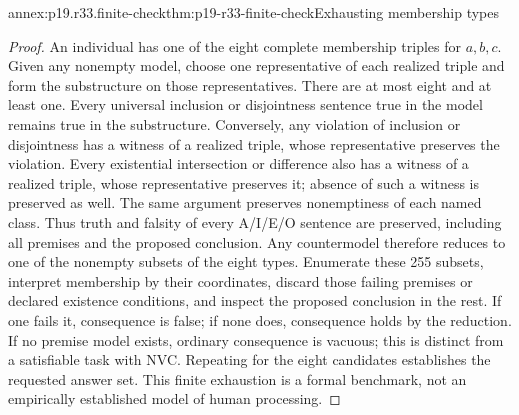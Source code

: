 \begin{annexitem}{annex:p19.r33.finite-check}{thm:p19-r33-finite-check}{Exhausting membership types}
\begin{proof}
An individual has one of the eight complete membership triples for
\(a,b,c\). Given any nonempty model, choose one representative of
each realized triple and form the substructure on those representatives.
There are at most eight and at least one. Every universal inclusion or
disjointness sentence true in the model remains true in the substructure.
Conversely, any violation of inclusion or disjointness has a witness of
a realized triple, whose representative preserves the violation.
Every existential intersection or difference also has a witness of a
realized triple, whose representative preserves it; absence of such a
witness is preserved as well. The same argument preserves nonemptiness
of each named class. Thus truth and falsity of every A/I/E/O sentence
are preserved, including all premises and the proposed conclusion.
Any countermodel therefore reduces to one of the nonempty subsets of
the eight types. Enumerate these 255 subsets, interpret membership by
their coordinates, discard those failing premises or declared existence
conditions, and inspect the proposed conclusion in the rest. If one
fails it, consequence is false; if none does, consequence holds by the
reduction. If no premise model exists, ordinary consequence is vacuous;
this is distinct from a satisfiable task with NVC. Repeating for the
eight candidates establishes the requested answer set. This finite
exhaustion is a formal benchmark, not an empirically established model
of human processing.
\end{proof}
\end{annexitem}
